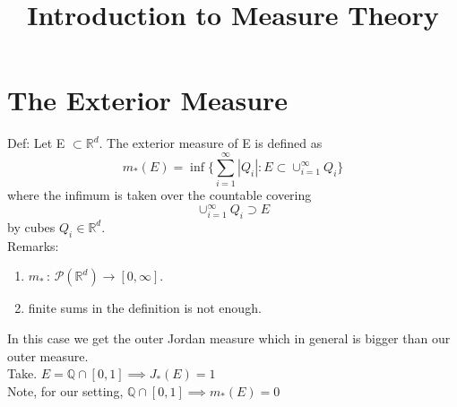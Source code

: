 \documentclass{article}[12 pt]
\title{Introduction to Measure Theory}
\begin{document}
\maketitle
\section{The Exterior Measure}

Def: Let E $\subset \mathbb{R}^d$. The exterior measure of E is defined as
\begin{equation}
	m_{*}(E) = \inf \{ \sum_{i=1}^{\infty} |Q_i| : E \subset \cup_{i=1}^{\infty} Q_i \}
\end{equation}
where the infimum is taken over the countable covering
\begin{equation}
	\cup_{i=1}^{\infty} Q_i \supset E
\end{equation}
by cubes $Q_i \in \mathbb{R}^d$. \\

Remarks:
\begin{enumerate}
	\item $m_{*}\, :\, \mathcal{P} (\mathbb{R}^d) \to [0, \infty]$.
	\item finite sums in the definition is not enough.
\end{enumerate}

In this case we get the outer Jordan measure which in general is bigger than our outer measure.\\
Take. $E = \mathbb{Q} \cap [0,1] \implies J_{*}(E) = 1$ \\

Note, for our setting, $\mathbb{Q} \cap [0,1] \implies m_{*}(E) = 0$
\end{document}
